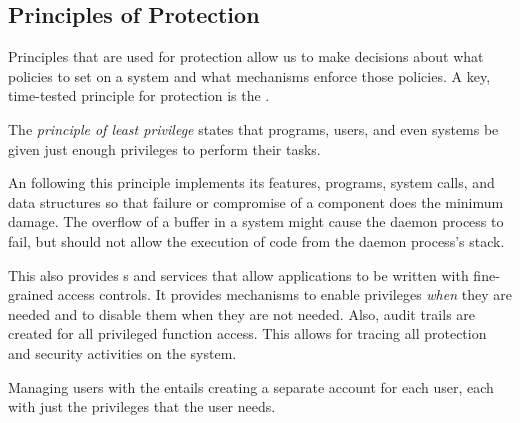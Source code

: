 \subsection{Principles of Protection}\label{subsec:Protection_Principles}
Principles that are used for protection allow us to make decisions about what policies to set on a system and what mechanisms enforce those policies.
A key, time-tested principle for protection is the .

\begin{definition}\label{def:Principle_Least_Privilege}
  The \emph{principle of least privilege} states that programs, users, and even systems be given just enough privileges to perform their tasks.
\end{definition}

An  following this principle implements its features, programs, system calls, and data structures so that failure or compromise of a component does the minimum damage.
The overflow of a buffer in a system  might cause the daemon process to fail, but should not allow the execution of code from the daemon process’s stack.

This  also provides s and services that allow applications to be written with fine-grained access controls.
It provides mechanisms to enable privileges \emph{when} they are needed and to disable them when they are not needed.
Also, audit trails are created for all privileged function access.
This allows for tracing all protection and security activities on the system.

Managing users with the  entails creating a separate account for each user, each with just the privileges that the user needs.

